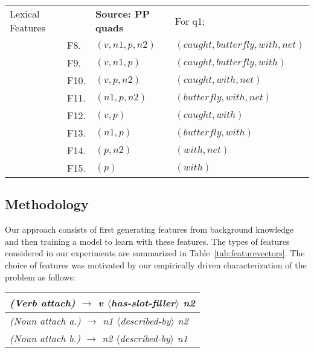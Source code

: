 \begin{table*}[th]
\begin{tabular}{ |l| l|l|l| }
Lexical  Features& &  {\bf Source: PP quads} & For q1;\\ 
& F8.  & $(v, n1, p, n2)$ & $(caught,butterfly,with,net)$ \\
& F9. & $(v, n1, p)$ & $(caught,butterfly,with)$ \\
& F10. & $(v, p, n2)$ & $(caught,with,net)$ \\ 
& F11. & $(n1, p, n2)$ &$(butterfly,with,net)$ \\ 
& F12.  & $(v,p) $ & $(caught,with)$\\ 
& F13.  & $(n1,p) $ & $(butterfly,with)$\\ 
& F14. & $(p,n2) $ & $(with,net)$ \\ 
   &F15.  &$(p) $ & $(with)$\\  
\hline
\end{tabular}
\caption{Types of  features considered in our experiments. All features have values of 1 or 0.  The PP quads used as running examples are:  $q1=\{caught, butterfly, with, net\}: V$, $q2=\{caught, butterfly, with, spots\}: N$.}
\label{tab:featurevectors}
\end{table*}
   
 

\subsection{Methodology} 



Our approach consists of first generating features from background knowledge and then training a model to learn with these features.
 The types of features considered in our experiments are  summarized  in Table~\ref{tab:featurevectors}.  The choice of features was motivated by our empirically driven characterization of the problem as follows:
\begin{table}[h]
\centering
\begin{tabular}{p{7cm}}
\textit{(Verb attach) $\longrightarrow$ v $\langle$has-slot-filler$\rangle$ n2} \\
\hline
\textit{(Noun attach a.) $\longrightarrow$ n1 $\langle$described-by$\rangle$ n2}\\
\textit{(Noun attach b.) $\longrightarrow$ n2 $\langle$described-by$\rangle$ n1}\\
\end{tabular}
\label{tbl:example}
\end{table}

